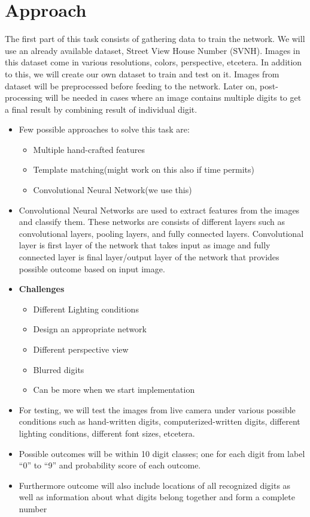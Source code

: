 \documentclass[12pt, letterpaper]{article}
\begin{document}
\section{Approach}
The first part of this task consists of gathering data to train the network. We will use an already available dataset, Street View House Number (SVNH)\cite{Reading Digits in Natural Images
	with Unsupervised Feature Learning}. Images in this dataset come in various resolutions, colors, perspective, etcetera. In addition to this, we will create our own dataset to train and test on it. 
Images from dataset will be preprocessed before feeding to the network. Later on, post-processing will be needed in cases where an image contains multiple digits to get a final result by combining result of individual digit. 
\begin{itemize}
	\item Few possible approaches to solve this task are:
		\begin{itemize}
			\item Multiple hand-crafted features
			\item Template matching(might work on this also if time permits)
			\item Convolutional Neural Network(we use this)
		\end{itemize}
	\item Convolutional Neural Networks are used to extract features
	from the images and classify them. These networks are consists of different layers such as convolutional layers, pooling layers, and fully connected layers. Convolutional layer is first layer of the network that takes input as image and fully connected layer is final layer/output layer of the network that provides possible outcome based on input image.
	\item  \textbf{Challenges}
		\begin{itemize}
			\item Different Lighting conditions
			\item Design an appropriate network
			\item Different perspective view
			\item Blurred digits 
			\item Can be more when we start implementation
			
		\end{itemize}
	\item For testing, we will test the images from live camera under various possible conditions such as hand-written digits, computerized-written digits, different lighting conditions, different font sizes, etcetera.
	\item Possible outcomes will be within 10 digit classes; one for each digit from label ``0'' to ``9'' and probability score of each outcome.
	\item Furthermore outcome will also include locations of all recognized digits as well as information about what digits belong together and form a complete number
\end{itemize}
\end{document}
